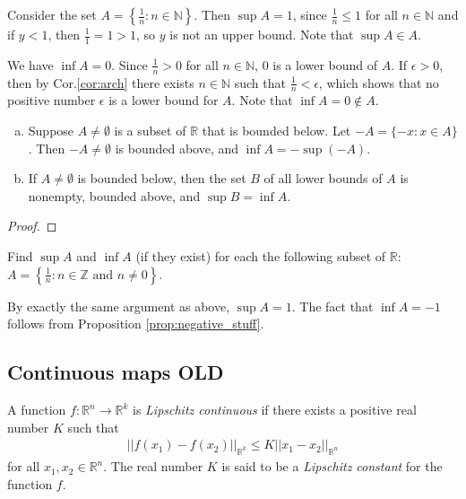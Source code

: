 \documentclass[12pt,letterpaper,reqno]{article}
\numberwithin{equation}{section}
\newcommand{\R}{\ensuremath{\mathbb R}}
\newcommand{\Z}{\ensuremath{\mathbb Z}}
\newcommand{\N}{{\mathbb N}}
\newcommand{\fixme}[1]{{\color{orange}{[#1]}}}
\begin{document}
{\begin{example}
Consider the set $A=\left\{\frac{1}{n}:n \in \N\right\}$. Then $\sup A=1$, since $\frac{1}{n}\leq 1$ for all $n \in \N$ and if $y<1$, then $\frac{1}{1}=1>1$, so $y$ is not an upper bound. Note that $\sup A \in A$.

	We have $\inf A=0$. Since $\frac{1}{n}>0$ for all $n \in \N$, $0$ is a lower bound of $A$. If $\epsilon>0$, then by Cor.\ref{cor:arch} there exists $n \in \N$ such that $\frac{1}{n}<\epsilon$, which shows that no positive number $\epsilon$ is a lower bound for $A$. Note that $\inf A=0 \notin A$.
\end{example}

\begin{prop}\label{prop:negative_stuff}
\begin{enumerate}[(a)]
	\item Suppose $A \neq \emptyset$ is a subset of $\R$ that is bounded below. Let $-A=\{-x:x \in A\}$. Then $-A \neq \emptyset$ is bounded above, and $\inf A=-\sup(-A)$.
	\item If $A \neq \emptyset$ is bounded below, then the set $B$ of all lower bounds of $A$ is nonempty, bounded above, and $\sup B=\inf A$.
\end{enumerate}	
\end{prop}

\begin{proof}
	\fixme{Finish.}
\end{proof}

\begin{exercise}
Find $\sup A$ and $\inf A$ (if they exist) for each the following subset of $\R$:
$A=\left\{\frac{1}{n}:n \in \Z \text{ and } n \neq 0\right\}$.
\end{exercise}

{\color{red}
\begin{solution}
	By exactly the same argument as above, $\sup A=1$.
	The fact that $\inf A=-1$ follows from Proposition \ref{prop:negative_stuff}. \fixme{Finish.}
\end{solution}
}
\subsection{Continuous maps OLD}
\begin{defn}
	A function $f:\R^n \to \R^k$ is \emph{Lipschitz continuous} if there exists a positive real number $K$ such that 
	\begin{align*}
		||f(x_1)-f(x_2)||_{\R^k}\leq K ||x_1-x_2||_{\R^n}
	\end{align*}
	for all $x_1,x_2 \in \R^n$. The real number $K$ is said to be a \emph{Lipschitz constant} for the function $f$. 
\end{defn}

}
\end{document}
